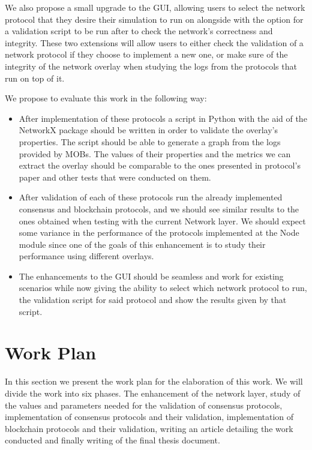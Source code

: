 We also propose a small upgrade to the GUI, allowing users to select the network
protocol that they desire their simulation to run on alongside with the option for
a validation script to be run after to check the network's correctness and integrity.
These two extensions will allow users to either check the validation of a network
protocol if they choose to implement a new one, or make sure of the integrity of
the network overlay when studying the logs from the protocols that run on top of it.

We propose to evaluate this work in the following way:

\begin{itemize}
  \item After implementation of these protocols a script in Python with the aid of
the NetworkX package should be written in order to validate the overlay's properties.
The script should be able to generate a graph from the logs provided by MOBs.
The values of their properties and the metrics we can extract the overlay should be
comparable to the ones presented in protocol's paper and other tests that were conducted
on them.
  \item After validation of each of these protocols run the already implemented
consensus and blockchain protocols, and we should see similar results to the ones obtained
when testing with the current Network layer. We should expect some variance in the 
performance of the protocols implemented at the Node module since one of the
goals of this enhancement is to study their performance using different overlays.
  \item The enhancements to the GUI should be seamless and work for existing scenarios
while now giving the ability to select which network protocol to run, the validation
script for said protocol and show the results given by that script.
\end{itemize}


\section{Work Plan}\label{sub:work_plan}

In this section we present the work plan for the elaboration of this work.
We will divide the work into six phases. The enhancement of the network layer,
study of the values and parameters needed for the validation of consensus protocols,
implementation of consensus protocols and their validation, implementation of blockchain
protocols and their validation, writing an article detailing the work conducted and
finally writing of the final thesis document.

